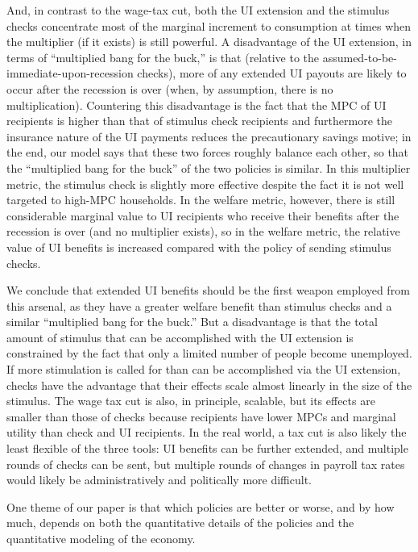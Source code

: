 \documentclass[\econtexRoot/HAFiscal]{subfiles}
\begin{document}
And, in contrast to the wage-tax cut, both the UI extension and the stimulus checks concentrate most of the marginal increment to consumption at times when the multiplier (if it exists) is still powerful.  A disadvantage of the UI extension, in terms of ``multiplied bang for the buck,'' is that (relative to the assumed-to-be-immediate-upon-recession checks), more of any extended UI payouts are likely to occur after the recession is over (when, by assumption, there is no multiplication).  Countering this disadvantage is the fact that the MPC of UI recipients is higher than that of stimulus check recipients and furthermore the insurance nature of the UI payments reduces the precautionary savings motive; in the end, our model says that these two forces roughly balance each other, so that the ``multiplied bang for the buck'' of the two policies is similar.  In this multiplier metric, the stimulus check is slightly more effective despite the fact it is not well targeted to high-MPC households.  In the welfare metric, however, there is still considerable marginal value to UI recipients who receive their benefits after the recession is over (and no multiplier exists), so in the welfare metric, the relative value of UI benefits is increased compared with the policy of sending stimulus checks.

We conclude that extended UI benefits should be the first weapon employed from this arsenal, as they have a greater welfare benefit than stimulus checks and a similar ``multiplied bang for the buck.'' But a disadvantage is that the total amount of stimulus that can be accomplished with the UI extension is constrained by the fact that only a limited number of people become unemployed.  If more stimulation is called for than can be accomplished via the UI extension, checks have the advantage that their effects scale almost linearly in the size of the stimulus.  The wage tax cut is also, in principle, scalable, but its effects are smaller than those of checks because recipients have lower MPCs and marginal utility than check and UI recipients.  In the real world, a tax cut is also likely the least flexible of the three tools:  UI benefits can be further extended, and multiple rounds of checks can be sent, but multiple rounds of changes in payroll tax rates would likely be administratively and politically more difficult.

One theme of our paper is that which policies are better or worse, and by how much, depends on both the quantitative details of the policies and the quantitative modeling of the economy.  
\end{document}
